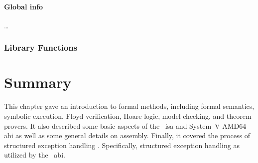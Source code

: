 \paragraph{Global info}
\todo\dots

\subsubsection{Library Functions}

\section{Summary}
This chapter gave an introduction to formal methods, including formal semantics,
symbolic execution, Floyd verification, Hoare logic, model checking, and theorem provers.
It also described some basic aspects of the \arch\ \ac{isa} and System~V
AMD64 \ac{abi}
as well as some general details on assembly.
Finally, it covered the process of structured exception handling%
.
Specifically, structured exception handling as utilized by the \Cpp\ \ac{abi}.
